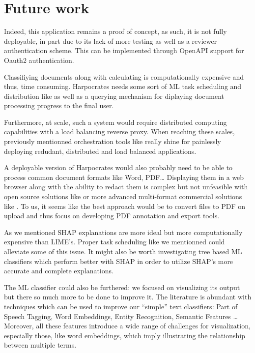 \documentclass[\version]{l4proj}
\begin{document}
\section{Future work}

Indeed, this application remains a proof of concept, as such, it is not fully deployable, in part due to its lack of more testing as well as a reviewer authentication scheme.
This can be implemented through OpenAPI support for Oauth2 authentication.

Classifiying documents along with calculating is computationally expensive and thus, time consuming.
Harpocrates needs some sort of ML task scheduling and distribution like \textcite{Celery2020} as well as a querying mechanism for diplaying document processing progress to the final user.

Furthermore, at scale, such a system would require distributed computing capabilities with a load balancing reverse proxy.
When reaching these scales, previously mentionned orchestration tools like \textcite{Kubernetes2020} really shine for painlessly deploying redudant, distributed and load balanced applications.

A deployable version of Harpocrates would also probably need to be able to process common document formats like Word, PDF\dots %
Displaying them in a web browser along with the ability to redact them is complex but not unfeasible with open source solutions like \textcite{tyurinAgentcooperReactpdfhighlighter2020} or more advanced multi-format commercial solutions like \textcite{ReactPDFLibrary2020}.
To us, it seems like the best approach would be to convert files to PDF on upload and thus focus on developing PDF annotation and export tools.

As we mentioned SHAP explanations are more ideal but more computationally expensive than LIME's.
Proper task scheduling like we mentionned could alleviate some of this issue.
It might also be worth investigating tree based ML classifiers which perform better with SHAP in order to utilize SHAP's more accurate and complete explanations.

The ML classifier could also be furthered: we focused on visualizing its output but there so much more to be done to improve it.
The literature is abundant with techniques which can be used to improve our ``simple'' text classifiers: Part of Speech Tagging, Word Embeddings, Entity Recognition, Semantic Features \dots %
Moreover, all these features introduce a wide range of challenges for visualization, especially those, like word embeddings, which imply illustrating the relationship between multiple terms.
\end{document}
